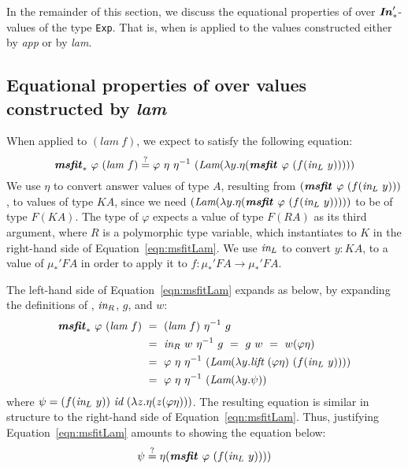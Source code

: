 In the remainder of this section, we discuss the equational properties
of \msfit{*} over $\textbf{\textit{In}}_{*}'$-values of the type \lstinline{Exp}. That is,
when \msfit{*} is applied to the values constructed either by \textit{app}
or by \textit{lam}.

\subsection{Equational properties of \msfit{*} over
	values constructed by \textit{lam}}
When applied to $(\textit{lam}~f)$, we expect \msfit{*} to
satisfy the following equation:
\begin{equation}
\textbf{\textit{msfit}}_{*}~\varphi~(\textit{lam}~f)
\stackrel{?}{=} \varphi~\eta~\eta^{-1}
	~(\textit{Lam}(\lambda y.\eta(\textbf{\textit{msfit}}_{~}\varphi~(f(\textit{in}_{L}~y)))))
\label{eqn:msfitLam}
\end{equation}
We use $\eta$ to convert answer values of type $A$, resulting from
$(\textbf{\textit{msfit}}_{~}\varphi~(f(\textit{in}_{L}~y)))$, to values of type $KA$, since we need
$(\textit{Lam}(\lambda y.\eta(\textbf{\textit{msfit}}_{~}\varphi~(f(\textit{in}_{L}~y)))))$
to be of type $F(KA)$. The type of $\varphi$ expects a value of type $F(RA)$
as its third argument, where $R$ is a polymorphic type variable, which
instantiates to $K$ in the right-hand side of Equation~\ref{eqn:msfitLam}.
We use $\textit{in}_{L}$ to convert $y : KA$, to a value of $\mu_{*}' F A$
in order to apply it to $f : \mu_{*}' F A \to \mu_{*}' F A$.

The left-hand side of Equation~\ref{eqn:msfitLam} expands as below,
by expanding the definitions of \msfit{*}, $\textit{in}_{R}$, $g$, and  $w$:
\begin{align*}
\textbf{\textit{msfit}}_{*}~\varphi~(\textit{lam}~f)
&~=~ (\textit{lam}~f)~\eta^{-1}~g \\
&~=~ \textit{in}_{R}~w~\eta^{-1}~g ~=~ g~w ~=~ w(\varphi\eta) \\
&~=~ \varphi~\eta~\eta^{-1}~
	(\textit{Lam}(\lambda y.\textit{lift}~(\varphi\eta)~(f(\textit{in}_{L}~y)))) \\
&~=~ \varphi~\eta~\eta^{-1}~(\textit{Lam}(\lambda y.\psi))
\end{align*}
where $\psi = (f(\textit{in}_{L}~y))~\textit{id}~(\lambda z.\eta(z(\varphi\eta)))$.
The resulting equation is similar in structure to the right-hand side of
Equation~\ref{eqn:msfitLam}. Thus, justifying Equation~\ref{eqn:msfitLam}
amounts to showing the equation below:
\begin{equation}
\psi \stackrel{?}{=} \eta(\textbf{\textit{msfit}}_{~}\varphi~(f(\textit{in}_{L}~y))))
\label{eqn:msfitPsi}
\end{equation}

